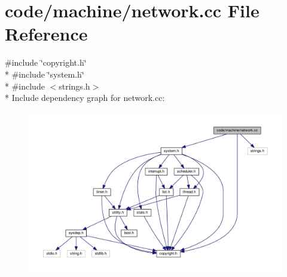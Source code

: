 \section{code/machine/network.cc File Reference}
\label{network_8cc}
{\ttfamily \#include \char`\"{}copyright.\+h\char`\"{}}\\*
{\ttfamily \#include \char`\"{}system.\+h\char`\"{}}\\*
{\ttfamily \#include $<$strings.\+h$>$}\\*
Include dependency graph for network.\+cc\+:
\nopagebreak
\begin{figure}[H]
\begin{center}
\leavevmode
\includegraphics[width=350pt]{network_8cc__incl}
\end{center}
\end{figure}
